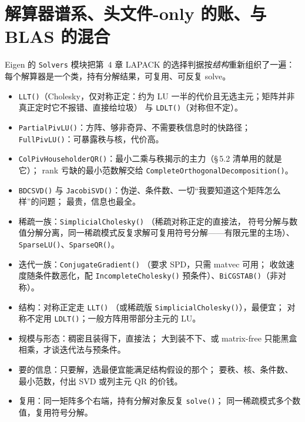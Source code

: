 \documentclass[12pt,a4paper,fontset=fandol]{ctexbook}
\newcommand{\Fn}[1]{\texttt{#1()}}
\newcommand{\Tp}[1]{\texttt{#1}}
\newcommand{\Bk}{\allowbreak}
\begin{document}
\section{解算器谱系、头文件-only 的账、与 BLAS 的混合}

Eigen 的 \Tp{Solvers} \Bk{} 模块把第~4 章 LAPACK 的选择判据按\emph{结构}重新组织了一遍：
每个解算器是一个类，持有分解结果，可复用、可反复 solve。

\begin{itemize}
\item \Fn{LLT}（Cholesky，仅对称正定：约为 LU 一半的代价且无选主元；矩阵并非真正定时它不报错、直接给垃圾）
  与 \Fn{LDLT}（对称但不定）。
\item \Fn{PartialPivLU}：方阵、够非奇异、不需要秩信息时的快路径；
  \Fn{FullPivLU}：可暴露秩与核，代价高。
\item \Fn{ColPivHouseholderQR}：最小二乘与秩揭示的主力（\S\,5.2 清单用的就是它）；
  rank 亏缺的最小范数解交给 \Fn{CompleteOrthogonalDecomposition}。
\item \Fn{BDCSVD} 与 \Fn{JacobiSVD}：伪逆、条件数、一切``我要知道这个矩阵怎么样''的问题；
  最贵，信息也最全。
\item 稀疏一族：\Fn{SimplicialCholesky} \Bk{}（稀疏对称正定的直接法，
  符号分解与数值分解分离，同一稀疏模式反复求解可复用符号分解——有限元里的主场）、
  \Fn{SparseLU}、\Fn{SparseQR}。
\item 迭代一族：\Fn{ConjugateGradient} \Bk{}（要求 SPD，只需 matvec 可用；
  收敛速度随条件数恶化，配 \Fn{IncompleteCholesky} 预条件）、\Fn{BiCGSTAB}（非对称）。
\end{itemize}

\begin{guideline}[title={解算器选择判据}]
\begin{itemize}
\item 结构：对称正定走 \Fn{LLT} \Bk{}（或稀疏版 \Fn{SimplicialCholesky}），最便宜；
  对称不定用 \Fn{LDLT}；一般方阵用带部分主元的 LU。
\item 规模与形态：稠密且装得下，直接法；
  大到装不下、或 matrix-free 只能黑盒相乘，才谈迭代法与预条件。
\item 要的信息：只要解，选最便宜能满足结构假设的那个；
  要秩、核、条件数、最小范数，付出 SVD 或列主元 QR 的价钱。
\item 复用：同一矩阵多个右端，持有分解对象反复 \Fn{solve}；
  同一稀疏模式多个数值，复用符号分解。
\end{itemize}
\end{guideline}
\end{document}
